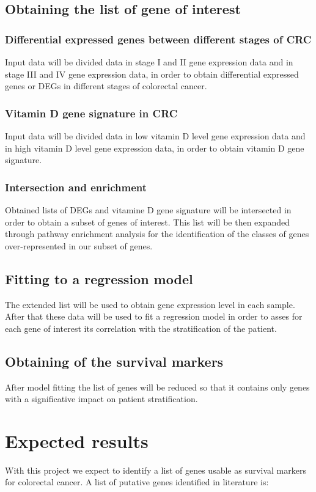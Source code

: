 \documentclass[fleqn,10pt]{SelfArx} %
\begin{document}
	\subsection{Obtaining the list of gene of interest}

		\subsubsection{Differential expressed genes between different stages of CRC}
		Input data will be divided data in stage I and II gene expression data and in stage III and IV gene expression data, in order to obtain differential expressed genes or DEGs in different stages of colorectal cancer.


		\subsubsection{Vitamin D gene signature in CRC}
		Input data will be divided data in low vitamin D level gene expression data and in high vitamin D level gene expression data, in order to obtain vitamin D gene signature.


		\subsubsection{Intersection and enrichment}
		Obtained lists of DEGs and vitamine D gene signature will be intersected in order to obtain a subset of genes of interest. 
		This list will be then expanded through pathway enrichment analysis for the identification of the classes of genes over-represented in our subset of genes.

	\subsection{Fitting to a regression model}
	The extended list will be used to obtain gene expression level in each sample.
	After that these data will be used to fit a regression model in order to asses for each gene of interest its correlation with the stratification of the patient.

	\subsection{Obtaining of the survival markers}
	After model fitting the list of genes will be reduced so that it contains only genes with a significative impact on patient stratification.

\section{Expected results}
With this project we expect to identify a list of genes usable as survival markers for colorectal cancer.
A list of putative genes identified in literature \cite{Bu2021-we} \cite{Ferrer-Mayorga2017-dv} \cite{Martinez-Romero2018-gp} \cite{Wang2020-mr} is:
\end{document}
